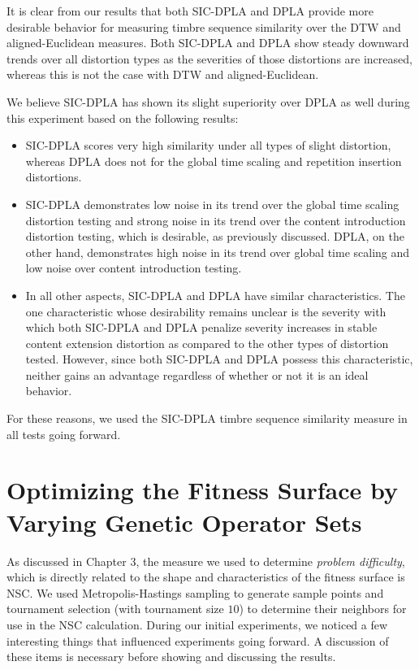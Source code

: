 \documentclass[a4paper,12pt]{report} 	%
\numberwithin{figure}{chapter}
\numberwithin{table}{chapter}
\numberwithin{equation}{chapter}
\begin{document}
\begin{flushleft}
It is clear from our results that both SIC-DPLA and DPLA provide more desirable behavior for measuring timbre sequence similarity over the DTW and aligned-Euclidean measures. Both SIC-DPLA and DPLA show steady downward trends over all distortion types as the severities of those distortions are increased, whereas this is not the case with DTW and aligned-Euclidean.

We believe SIC-DPLA has shown its slight superiority over DPLA as well during this experiment based on the following results:
\begin{itemize}
\item SIC-DPLA scores very high similarity under all types of slight distortion, whereas DPLA does not for the global time scaling and repetition insertion distortions. 
\item SIC-DPLA demonstrates low noise in its trend over the global time scaling distortion testing and strong noise in its trend over the content introduction distortion testing, which is desirable, as previously discussed. DPLA, on the other hand, demonstrates high noise in its trend over global time scaling and low noise over content introduction testing.
\item In all other aspects, SIC-DPLA and DPLA have similar characteristics. The one characteristic whose desirability remains unclear is the severity with which both SIC-DPLA and DPLA penalize severity increases in stable content extension distortion as compared to the other types of distortion tested. However, since both SIC-DPLA and DPLA possess this characteristic, neither gains an advantage regardless of whether or not it is an ideal behavior.
\end{itemize}

For these reasons, we used the SIC-DPLA timbre sequence similarity measure in all tests going forward.

\section{Optimizing the Fitness Surface by Varying Genetic Operator Sets}
As discussed in Chapter 3, the measure we used to determine \emph{problem difficulty}, which is directly related to the shape and characteristics of the fitness surface is NSC. We used Metropolis-Hastings sampling to generate sample points and tournament selection (with tournament size $10$) to determine their neighbors for use in the NSC calculation. During our initial experiments, we noticed a few interesting things that influenced experiments going forward. A discussion of these items is necessary before showing and discussing the results.

\end{flushleft}
\end{document}
